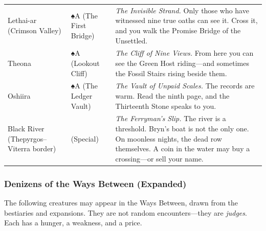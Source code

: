 \begin{longtable}{p{} p{} p{}}
Lethai-ar (Crimson Valley) & ♠A (The First Bridge) & \textit{The Invisible Strand.} Only those who have witnessed nine true oaths can see it. Cross it, and you walk the Promise Bridge of the Unsettled. \\
Theona & ♠A (Lookout Cliff) & \textit{The Cliff of Nine Views.} From here you can see the Green Host riding---and sometimes the Fossil Stairs rising beside them. \\
Oshiira & ♠A (The Ledger Vault) & \textit{The Vault of Unpaid Scales.} The records are warm. Read the ninth page, and the Thirteenth Stone speaks to you. \\
Black River (Thepyrgos--Viterra border) & (Special) & \textit{The Ferryman's Slip.} The river is a threshold. Bryn's boat is not the only one. On moonless nights, the dead row themselves. A coin in the water may buy a crossing---or sell your name. \\
\end{longtable}

\subsubsection*{Denizens of the Ways Between (Expanded)}
The following creatures may appear in the Ways Between, drawn from the bestiaries and expansions. They are not random encounters---they are \emph{judges}. Each has a hunger, a weakness, and a price.

